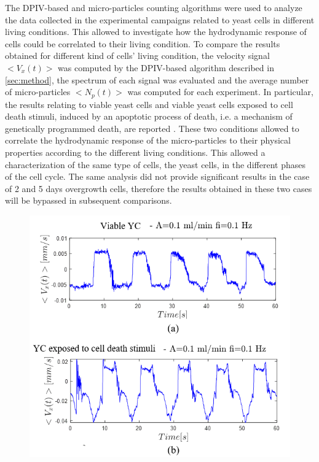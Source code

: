 \documentclass[journal]{IEEEtran}
\theoremstyle{definition}
\theoremstyle{remark}
\begin{document}
The DPIV-based and micro-particles counting algorithms were used to analyze the data collected in the experimental campaigns related to yeast cells in different living conditions. This allowed to investigate how the hydrodynamic response of cells could be correlated to their living condition.  To compare the results obtained for different kind of cells' living condition, the velocity signal $<V_x(t)>$ was computed by the DPIV-based algorithm described in \sect\ref{sec:method}, the spectrum of each signal was evaluated and the average number of micro-particles $<N_p(t)>$ was computed for each experiment. 
In particular, the results relating to viable yeast cells and viable yeast cells exposed to cell death stimuli, induced by an apoptotic process of death, i.e. a mechanism of genetically programmed death, are reported . These two conditions allowed to correlate the hydrodynamic response of the micro-particles to their physical properties according to the different living conditions. This allowed a characterization of the same type of cells, the yeast cells, in the different phases of the cell cycle.
The same analysis did not provide significant results in the case of 2 and 5 days overgrowth cells, therefore the results obtained in these two cases will be bypassed in subsequent comparisons. 

\begin{figure}[t]
	\centering
	\includegraphics[width=1\columnwidth]{images/Yeast}
\end{figure}
\end{document}
